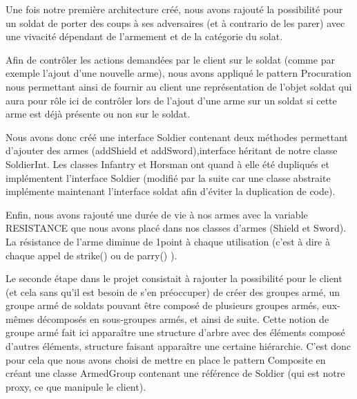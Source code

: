 Une fois notre première architecture créé, nous avons rajouté la possibilité pour un soldat de porter des coups à ses adversaires (et à contrario de les parer) avec une vivacité dépendant de l'armement et de la catégorie du solat.



Afin de contrôler les actions demandées par le client sur le soldat (comme par exemple l'ajout d'une nouvelle arme), nous avons appliqué le pattern Procuration nous permettant ainsi de fournir au client une représentation de l'objet soldat qui aura pour rôle ici de contrôler lors de l'ajout d'une arme sur un soldat si cette arme est déjà présente ou non sur le soldat.

Nous avons donc créé une interface Soldier contenant deux méthodes permettant d'ajouter des armes (addShield et addSword),interface héritant de notre classe SoldierInt. 
Les classes Infantry et Horsman ont quand à elle été dupliqués et implémentent l'interface Soldier (modifié par la suite car une classe abstraite implémente maintenant l'interface soldat afin d'éviter la duplication de code).

Enfin, nous avons rajouté une durée de vie à nos armes avec la variable RESISTANCE que nous avons placé dans nos classes d'armes (Shield et Sword). La résistance de l'arme diminue de 1point à chaque utilisation (c'est à dire à chaque appel de strike() ou de parry() ).



Le seconde étape dans le projet consistait à rajouter la possibilité pour le client (et cela sans qu'il est besoin de s'en préoccuper) de créer des groupes armé, un groupe armé de soldats pouvant être composé de plusieurs groupes armés, eux-mêmes décomposés en sous-groupes armés, et ainsi de suite. Cette notion de groupe armé fait ici apparaître une structure d'arbre avec des éléments composé d'autres éléments, structure faisant apparaître une certaine hiérarchie. 
C'est donc pour cela que nous avons choisi de mettre en place le pattern Composite en créant une classe ArmedGroup contenant une référence de Soldier (qui est notre proxy, ce que manipule le client).



